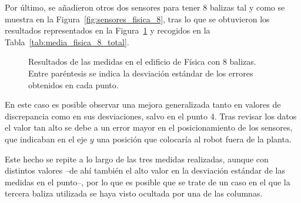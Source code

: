 Por último, se añadieron otros dos sensores para tener 8 balizas tal y como se muestra en la Figura~\ref{fig:sensores_fisica_8}, tras lo que se obtuvieron los resultados representados en la Figura~\ref{fig:res_fisica_8} y recogidos en la Tabla~\ref{tab:media_fisica_8_total}.
\begin{figure}[H]
    \centering
    
    \caption{Resultados de las medidas en el edificio de Física con 8 balizas. \newline Entre paréntesis se indica la desviación estándar de los errores obtenidos en cada punto.}
    \label{fig:res_fisica_8}
\end{figure}

En este caso es posible observar una mejora generalizada tanto en valores de discrepancia como en sus desviaciones, salvo en el punto 4.
Tras revisar los datos el valor tan alto se debe a un error mayor en el posicionamiento de los sensores, que indicaban en el eje $y$ una posición que colocaría al robot fuera de la planta.

Este hecho se repite a lo largo de las tres medidas realizadas, aunque con distintos valores --de ahí también el alto valor en la desviación estándar de las medidas en el punto--, por lo que es posible que se trate de un caso en el que la tercera baliza utilizada se haya visto ocultada por una de las columnas.


